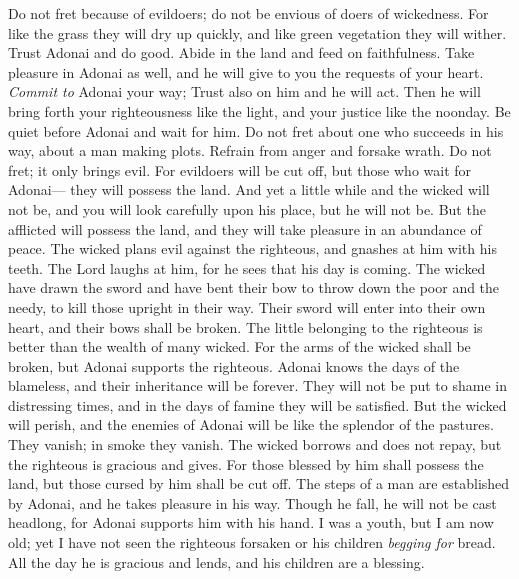 \begin{biblechapter} %
 Do not fret because of evildoers; 
do not be envious of doers of wickedness.
\verse For like the grass they will dry up quickly, 
and like green vegetation they will wither.
\verse Trust Adonai and do good. 
Abide in the land and feed on faithfulness.
\verse Take pleasure in Adonai as well, 
and he will give to you the requests of your heart.
\verse \textit{Commit to} Adonai your way; 
Trust also on him and he will act.
\verse Then he will bring forth your righteousness like the light, 
and your justice like the noonday.
\verse Be quiet before Adonai and wait for him. 
Do not fret about one who succeeds in his way, 
about a man making plots.
\verse Refrain from anger and forsake wrath. 
Do not fret; it only brings evil.
\verse For evildoers will be cut off, 
but those who wait for Adonai— 
they will possess the land.
\verse And yet a little while and the wicked will not be, 
and you will look carefully upon his place, but he will not be.
\verse But the afflicted will possess the land, 
and they will take pleasure in an abundance of peace.
\verse The wicked plans evil against the righteous, 
and gnashes at him with his teeth.
\verse The Lord laughs at him, 
for he sees that his day is coming.
\verse The wicked have drawn the sword and have bent their bow 
to throw down the poor and the needy, 
to kill those upright in their way.
\verse Their sword will enter into their own heart, 
and their bows shall be broken.
\verse The little belonging to the righteous is better 
than the wealth of many wicked.
\verse For the arms of the wicked shall be broken, 
but Adonai supports the righteous.
\verse Adonai knows the days of the blameless, 
and their inheritance will be forever.
\verse They will not be put to shame in distressing times, 
and in the days of famine they will be satisfied.
\verse But the wicked will perish, 
and the enemies of Adonai will be like the splendor of the pastures. 
They vanish; in smoke they vanish.
\verse The wicked borrows and does not repay, 
but the righteous is gracious and gives.
\verse For those blessed by him shall possess the land, 
but those cursed by him shall be cut off.
\verse The steps of a man are established by Adonai, 
and he takes pleasure in his way.
\verse Though he fall, he will not be cast headlong, 
for Adonai supports him with his hand.
\verse I was a youth, but I am now old; 
yet I have not seen the righteous forsaken 
or his children \textit{begging for} bread.
\verse All the day he is gracious and lends, 
and his children are a blessing.

\end{biblechapter}
